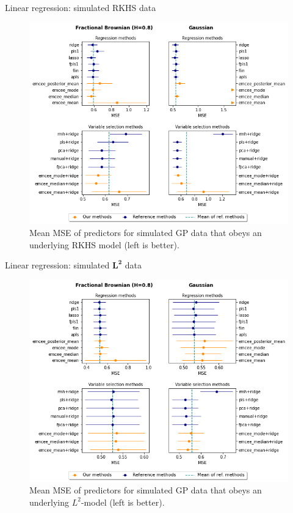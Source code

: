 \documentclass[10pt, english, professionalfonts]{beamer}
\begin{document}
\begin{frame}{Linear regression: simulated RKHS data}
  \vspace{1em}
  \begin{figure}
    \includegraphics[width=.75\textwidth]{img/reg_emcee_rkhs}
    \caption{Mean MSE of predictors for simulated GP data that obeys an underlying RKHS model (left is better).}
  \end{figure}
\end{frame}

\begin{frame}{Linear regression: simulated \(\bm{L^2}\) data}
  \vspace{1em}
  \begin{figure}
    \includegraphics[width=.75\textwidth]{img/reg_emcee_l2}
    \caption{Mean MSE of predictors for simulated GP data that obeys an underlying \(L^2\)-model (left is better).}
  \end{figure}
\end{frame}
\end{document}
